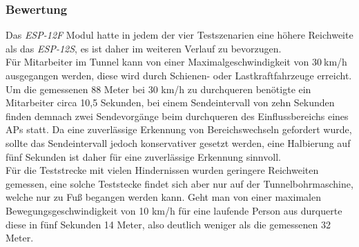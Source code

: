 \subsubsection{Bewertung}
\label{ch:Reichweite:sec:bewertung}
Das \emph{ESP-12F} Modul hatte in jedem der vier Testszenarien eine höhere Reichweite als das \emph{ESP-12S}, es ist daher im weiteren Verlauf zu bevorzugen.\\
Für Mitarbeiter im Tunnel kann von einer Maximalgeschwindigkeit von $30\ $km/h ausgegangen werden, diese wird durch Schienen- oder Lastkraftfahrzeuge erreicht. 
Um die gemessenen 88 Meter bei 30 km/h zu durchqueren benötigte ein Mitarbeiter circa 10,5 Sekunden, bei einem Sendeintervall von zehn Sekunden finden demnach zwei Sendevorgänge beim durchqueren des Einflussbereichs eines APs statt.
Da eine zuverlässige Erkennung von Bereichswechseln gefordert wurde, sollte das Sendeintervall jedoch konservativer gesetzt werden, eine Halbierung auf fünf Sekunden ist daher für eine zuverlässige Erkennung sinnvoll.
\\
Für die Teststrecke mit vielen Hindernissen wurden geringere Reichweiten gemessen, eine solche Teststecke findet sich aber nur auf der Tunnelbohrmaschine, welche nur zu Fuß begangen werden kann. 
Geht man von einer maximalen Bewegungsgeschwindigkeit von 10 km/h für eine laufende Person aus durquerte diese in fünf Sekunden 14 Meter, also deutlich weniger als die gemessenen 32 Meter.\\





